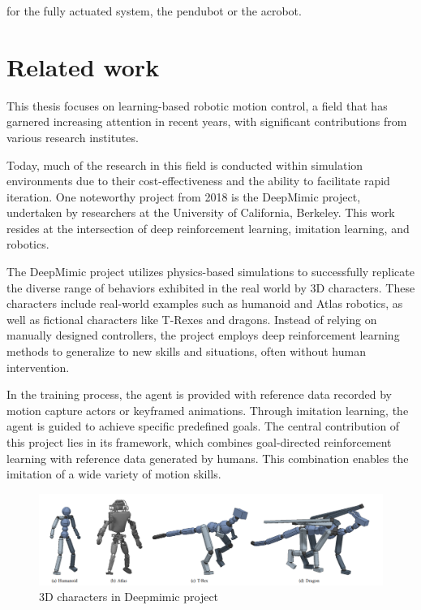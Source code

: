     for the fully actuated system, the pendubot or the acrobot.

\section{Related work}
This thesis focuses on learning-based robotic motion control, a field that has garnered increasing attention in recent years, with significant contributions from various research institutes.

Today, much of the research in this field is conducted within simulation environments due to their cost-effectiveness and the ability to facilitate rapid iteration. One noteworthy project from 2018 is the DeepMimic project\cite{peng2018deepmimic}, undertaken by researchers at the University of California, Berkeley. This work resides at the intersection of deep reinforcement learning, imitation learning, and robotics.

The DeepMimic project utilizes physics-based simulations to successfully replicate the diverse range of behaviors exhibited in the real world by 3D characters. These characters include real-world examples such as humanoid and Atlas robotics, as well as fictional characters like T-Rexes and dragons. Instead of relying on manually designed controllers, the project employs deep reinforcement learning methods to generalize to new skills and situations, often without human intervention.

In the training process, the agent is provided with reference data recorded by motion capture actors or keyframed animations. Through imitation learning, the agent is guided to achieve specific predefined goals. The central contribution of this project lies in its framework, which combines goal-directed reinforcement learning with reference data generated by humans. This combination enables the imitation of a wide variety of motion skills.

\begin{figure}[H]
  \centering
  \includegraphics[width=1.1\textwidth]{figures/deepmimic.png} %
  \caption{3D characters in Deepmimic project\cite{peng2018deepmimic}}
  \label{fig:deepmimic}
\end{figure}

